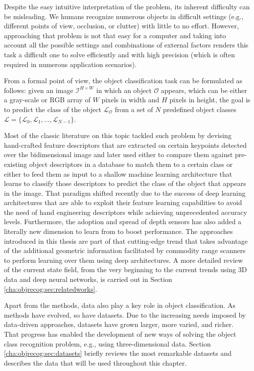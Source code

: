 Despite the easy intuitive interpretation of the problem, its inherent difficulty can be misleading. We humans recognize numerous objects in difficult settings (e.g., different points of view, occlusion, or clutter) with little to no effort. However, approaching that problem is not that easy for a computer and taking into account all the possible settings and combinations of external factors renders this task a difficult one to solve efficiently and with high precision (which is often required in numerous application scenarios).

From a formal point of view, the object classification task can be formulated as follows: given an image $\mathcal{I}^{H\times W}$ in which an object $\mathcal{O}$ appears, which can be either a gray-scale or RGB array of $W$ pixels in width and $H$ pixels in height, the goal is to predict the class of the object $\mathcal{L_O}$ from a set of $N$ predefined object classes $\mathcal{L} = \{\mathcal{L}_0, \mathcal{L}_1, ..., \mathcal{L}_{N-1}\}$.

Most of the classic literature on this topic tackled such problem by devising hand-crafted feature descriptors that are extracted on certain keypoints detected over the bidimensional image and later used either to compare them against pre-existing object descriptors in a database to match them to a certain class or either to feed them as input to a shallow machine learning architecture that learns to classify those descriptors to predict the class of the object that appears in the image. That paradigm shifted recently due to the success of deep learning architectures that are able to exploit their feature learning capabilities to avoid the need of hand engineering descriptors while achieving unprecedented accuracy levels. Furthermore, the adoption and spread of depth sensors has also added a literally new dimension to learn from to boost performance. The approaches introduced in this thesis are part of that cutting-edge trend that takes advantage of the additional geometric information facilitated by commodity range scanners to perform learning over them using deep architectures. A more detailed review of the current state field, from the very beginning to the current trends using 3D data and deep neural networks, is carried out in Section \ref{cha:objrecog:sec:relatedworks}.

Apart from the methods, data also play a key role in object classification. As methods have evolved, so have datasets. Due to the increasing needs imposed by data-driven approaches, datasets have grown larger, more varied, and richer. That progress has enabled the development of new ways of solving the object class recognition problem, e.g., using three-dimensional data. Section \ref{cha:objrecog:sec:datasets} briefly reviews the most remarkable datasets and describes the data that will be used throughout this chapter. 

